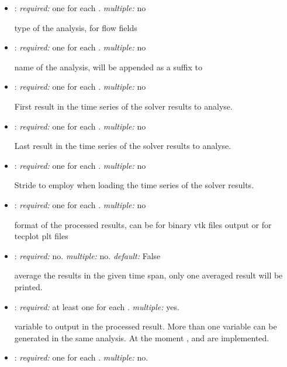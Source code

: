 \begin{itemize}
\item {}: \textit{required:} one for each . \textit{multiple:} no

type of the analysis,  for flow fields

\item {}: \textit{required:} one for each . \textit{multiple:} no

name of the analysis, will be appended as a suffix to 

\item {}: \textit{required:} one for each . \textit{multiple:} no

First result in the time series of the solver results to analyse.

\item {}: \textit{required:} one for each . \textit{multiple:} no

Last result in the time series of the solver results to analyse.

\item {}: \textit{required:} one for each . \textit{multiple:} no

Stride to employ when loading the time series of the solver results. 

\item {}: \textit{required:} one for each . \textit{multiple:} no

format of the processed results, can be  for binary vtk files output or  for tecplot plt files

\item {}: \textit{required:} no. \textit{multiple:} no. \textit{default:} False

average the results in the given time span, only one averaged result will be printed. 

\item {}: \textit{required:} at least one for each . \textit{multiple:} yes.

variable to output in the processed result. More than one variable can be generated in the same analysis. At the moment ,  and  are implemented.

\item {}: \textit{required:} one for each . \textit{multiple:} no.


\end{itemize}
